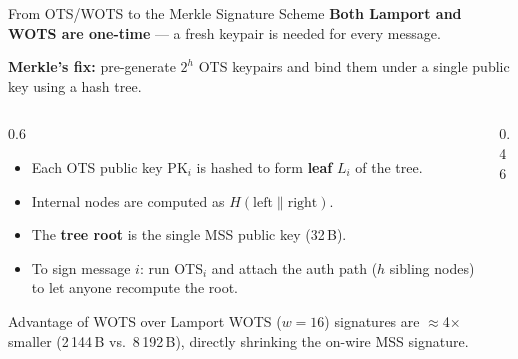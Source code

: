 \documentclass[aspectratio=169, 10pt]{beamer}
\begin{document}
\begin{frame}{From OTS/WOTS to the Merkle Signature Scheme}
\textbf{Both Lamport and WOTS are one-time} --- a fresh keypair is needed for every message.

\vspace{6pt}
\textbf{Merkle's fix:} pre-generate $2^h$ OTS keypairs and bind them under a single public key using a hash tree.

\begin{columns}
\begin{column}{0.6\textwidth}
\begin{itemize}
    \item Each OTS public key $\text{PK}_i$ is hashed to form \textbf{leaf} $L_i$ of the tree.
    \item Internal nodes are computed as $H(\text{left} \| \text{right})$.
    \item The \textbf{tree root} is the single MSS public key (32\,B).
    \item To sign message $i$: run OTS$_i$ and attach the auth path ($h$ sibling nodes) to let anyone recompute the root.
\end{itemize}
\vspace{4pt}

\begin{block}{Advantage of WOTS over Lamport}
WOTS ($w\!=\!16$) signatures are $\approx$4$\times$ smaller (2\,144\,B vs.\ 8\,192\,B), directly shrinking the on-wire MSS signature.
\end{block}

\end{column}
\begin{column}{0.46\textwidth}
\centering
{}
\end{column}
\end{columns}
\end{frame}
\end{document}
